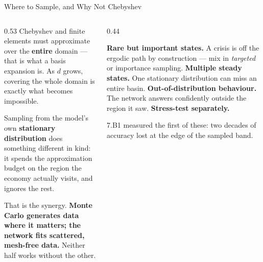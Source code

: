 \begin{frame}{Where to Sample, and Why Not Chebyshev}
\begin{columns}[T]
\begin{column}{0.53\textwidth}
\small
Chebyshev and finite elements must approximate over the \textbf{entire} domain --- that is what a basis expansion is. As $d$ grows, covering the whole domain is exactly what becomes impossible.
\medskip

Sampling from the model's own \textbf{stationary distribution} does something different in kind: it spends the approximation budget on the region the economy actually visits, and ignores the rest.
\medskip

That is the synergy. \textbf{Monte Carlo generates data where it matters; the network fits scattered, mesh-free data.} Neither half works without the other.
\end{column}
\begin{column}{0.44\textwidth}
\begin{cautionbox}[title=\textbf{Three concerns, and their remedies}]\small
\textbf{Rare but important states.} A crisis is off the ergodic path by construction --- mix in \emph{targeted} or importance sampling.
\medskip
\textbf{Multiple steady states.} One stationary distribution can miss an entire basin.
\medskip
\textbf{Out-of-distribution behaviour.} The network answers confidently outside the region it saw. \textbf{Stress-test separately.}
\end{cautionbox}
\medskip
\begin{examplebox}\footnotesize
7.B1 measured the first of these: two decades of accuracy lost at the edge of the sampled band.
\end{examplebox}
\end{column}
\end{columns}
\end{frame}

